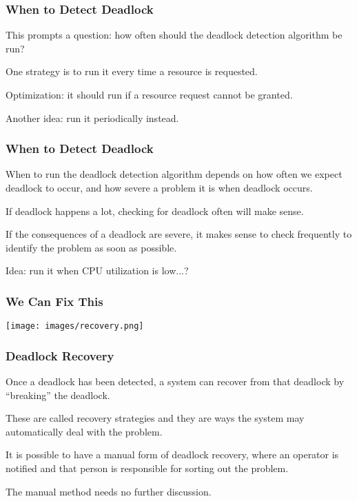 \begin{frame}
	\frametitle{When to Detect Deadlock}

	This prompts a question: how often should the deadlock detection algorithm be run?

	One strategy is to run it every time a resource is requested.

	Optimization: it should run if a resource request cannot be granted.

	Another idea: run it periodically instead.

\end{frame}

\begin{frame}
	\frametitle{When to Detect Deadlock}

	When to run the deadlock detection algorithm depends on how often we expect deadlock to occur, and how severe a problem it is when deadlock occurs.

	If deadlock happens a lot, checking for deadlock often will make sense.

	If the consequences of a deadlock are severe, it makes sense to check frequently to identify the problem as soon as possible.

	Idea: run it when CPU utilization is low...?

\end{frame}


\begin{frame}
	\frametitle{We Can Fix This}

	\begin{center}
		\texttt{[image: images/recovery.png]}
	\end{center}

\end{frame}


\begin{frame}
	\frametitle{Deadlock Recovery}

	Once a deadlock has been detected, a system can recover from that deadlock by ``breaking'' the deadlock.

	These are called recovery strategies and they are ways the system may automatically deal with the problem.

	It is possible to have a manual form of deadlock recovery, where an operator is notified and that person is responsible for sorting out the problem.

	The manual method needs no further discussion.


\end{frame}

